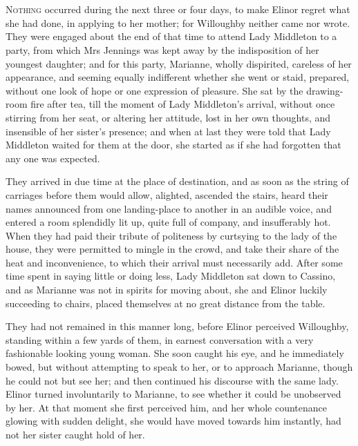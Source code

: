 \chapter[Chapter \thechapter]{}
\lettrine[lraise=0.3]{N}{othing} occurred during the next three or four days, to make Elinor regret what she had done, in applying to her mother; for Willoughby neither came nor wrote. They were engaged about the end of that time to attend Lady Middleton to a party, from which Mrs Jennings was kept away by the indisposition of her youngest daughter; and for this party, Marianne, wholly dispirited, careless of her appearance, and seeming equally indifferent whether she went or staid, prepared, without one look of hope or one expression of pleasure. She sat by the drawing-room fire after tea, till the moment of Lady Middleton's arrival, without once stirring from her seat, or altering her attitude, lost in her own thoughts, and insensible of her sister's presence; and when at last they were told that Lady Middleton waited for them at the door, she started as if she had forgotten that any one was expected.

They arrived in due time at the place of destination, and as soon as the string of carriages before them would allow, alighted, ascended the stairs, heard their names announced from one landing-place to another in an audible voice, and entered a room splendidly lit up, quite full of company, and insufferably hot. When they had paid their tribute of politeness by curtsying to the lady of the house, they were permitted to mingle in the crowd, and take their share of the heat and inconvenience, to which their arrival must necessarily add. After some time spent in saying little or doing less, Lady Middleton sat down to Cassino, and as Marianne was not in spirits for moving about, she and Elinor luckily succeeding to chairs, placed themselves at no great distance from the table.

They had not remained in this manner long, before Elinor perceived Willoughby, standing within a few yards of them, in earnest conversation with a very fashionable looking young woman. She soon caught his eye, and he immediately bowed, but without attempting to speak to her, or to approach Marianne, though he could not but see her; and then continued his discourse with the same lady. Elinor turned involuntarily to Marianne, to see whether it could be unobserved by her. At that moment she first perceived him, and her whole countenance glowing with sudden delight, she would have moved towards him instantly, had not her sister caught hold of her.



